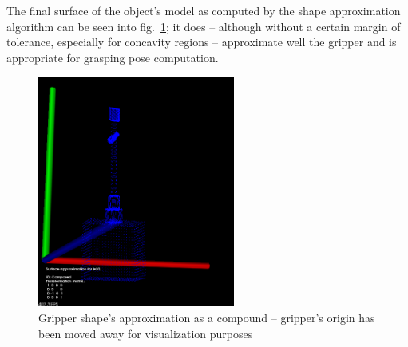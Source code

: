 The final surface of the object's model as computed by the shape approximation
algorithm can be seen into fig.~\ref{fig:approximation-of-gripper}; it does --
although without a certain margin of tolerance, especially for concavity
regions -- approximate well the gripper and is appropriate for grasping pose
computation.

\begin{figure}[htbp]
\centering
\includegraphics[height=3in]{./Results/Gripper_approx}
\caption{Gripper shape's approximation as a compound -- gripper's origin has
been moved away for visualization purposes \label{fig:approximation-of-gripper}}
\end{figure}



